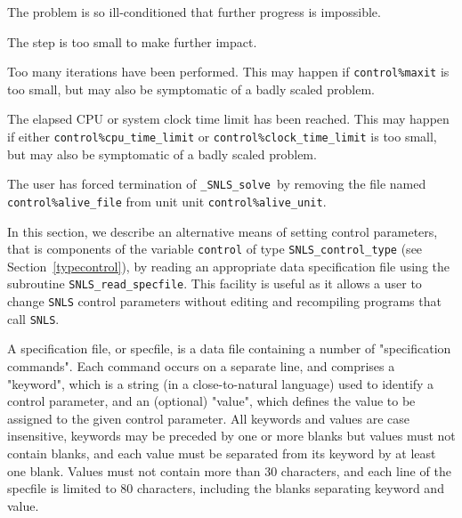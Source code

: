 \documentclass{galahad}
\newcommand{\packagename}{SNLS}
\newcommand{\fullpackagename}{\libraryname\_\packagename}
\newcommand{\solver}{{\tt \fullpackagename\_solve}}
\begin{document}
\begin{description}
 The problem is so ill-conditioned that
  further progress is impossible.

 The step is too small to make further impact.

 Too many iterations have been performed.
  This may happen if {\tt control\%maxit} is too small, but may also 
  be symptomatic of a badly scaled problem.

 The elapsed CPU or system clock time limit has been
    reached. This may happen if either {\tt control\%cpu\_time\-\_limit} or
    {\tt control\%clock\_time\_limit} is too small, but may also be symptomatic
    of a badly scaled problem.

 The user has forced termination of \solver\
     by removing the file named {\tt control\%a\-live\_file} from unit
     unit {\tt control\%alive\_unit}.

\end{description}


\galfeatures
\noindent In this section, we describe an alternative means of setting
control parameters, that is components of the variable {\tt control} of type
{\tt \packagename\_control\_type}
(see Section~\ref{typecontrol}),
by reading an appropriate data specification file using the
subroutine {\tt \packagename\_read\_specfile}. This facility
is useful as it allows a user to change  {\tt \packagename} control parameters
without editing and recompiling programs that call {\tt \packagename}.

A specification file, or specfile, is a data file containing a number of
"specification commands". Each command occurs on a separate line,
and comprises a "keyword",
which is a string (in a close-to-natural language) used to identify a
control parameter, and
an (optional) "value", which defines the value to be assigned to the given
control parameter. All keywords and values are case insensitive,
keywords may be preceded by one or more blanks but
values must not contain blanks, and
each value must be separated from its keyword by at least one blank.
Values must not contain more than 30 characters, and
each line of the specfile is limited to 80 characters,
including the blanks separating keyword and value.
\end{document}
